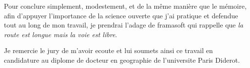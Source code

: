 \documentclass[12pt]{article}
\begin{document}
Pour conclure simplement, modestement, et de la même manière que le mémoire, afin d'appuyer l'importance de la science ouverte que j'ai pratique et defendue tout au long de mon travail, je prendrai l'adage de framasoft qui rappelle que \textit{la route est longue mais la voie est libre}.

Je remercie le jury de m'avoir ecoute et lui soumets ainsi ce travail en candidature au diplome de docteur en geographie de l'universite Paris Diderot.














\end{document}
